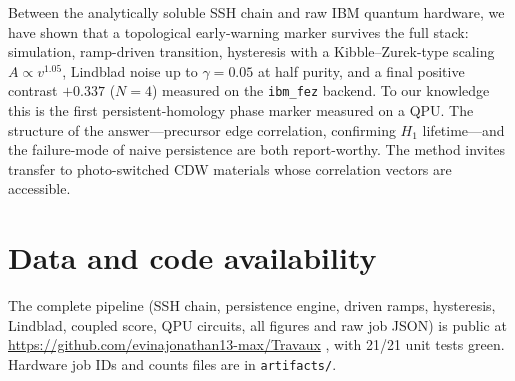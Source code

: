 \documentclass[11pt]{article}
\begin{document}
Between the analytically soluble SSH chain and raw IBM quantum hardware, we
have shown that a topological early-warning marker survives the full stack:
simulation, ramp-driven transition, hysteresis with a Kibble--Zurek-type
scaling $A\propto v^{1.05}$, Lindblad noise up to $\gamma=0.05$ at half
purity, and a final positive contrast $+0.337$ ($N=4$) measured on the
\texttt{ibm\_fez} backend. To our knowledge this is the first
persistent-homology phase marker measured on a QPU. The structure of the
answer---precursor edge correlation, confirming $H_1$ lifetime---and the
failure-mode of naive persistence are both report-worthy. The method invites
transfer to photo-switched CDW materials whose correlation vectors are
accessible.

\section*{Data and code availability}

The complete pipeline (SSH chain, persistence engine, driven ramps,
hysteresis, Lindblad, coupled score, QPU circuits, all figures and raw job
JSON) is public at
\url{https://github.com/evinajonathan13-max/Travaux} \cite{repo}, with
21/21 unit tests green. Hardware job IDs and
counts files are in \texttt{artifacts/}.
\end{document}
